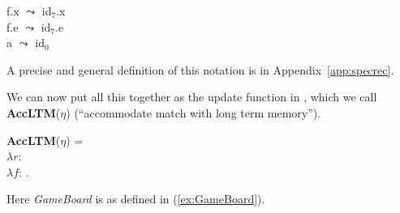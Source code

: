 \begin{ex}
\begin{subex}
\item  f.x $\leadsto$ id$_7$.x\\
       f.e $\leadsto$ id$_7$.e\\
       a $\leadsto$ id$_0$

\item {} 
 
\end{subex} 
   
\end{ex} 
A precise and general definition of this notation is in Appendix~\ref{app:specrec}.   


 
We can now put all this together as the update function in \nexteg{},
which we call \textbf{AccLTM}($\eta$) (``accommodate match with long term memory'').
\begin{ex}
\textbf{AccLTM}($\eta$) =\\ 
$\lambda r$:\\
\hspace*{1em}$\lambda
f$:  . \\
\hspace*{2em} 
\label{ex:AccLTM}
\end{ex}
\label{pg:inverserelabelling} 
Here \textit{GameBoard} is as defined in (\ref{ex:GameBoard}).
     
